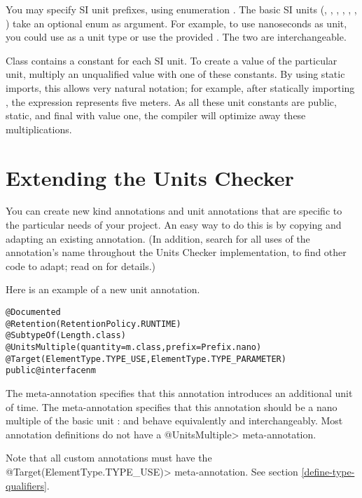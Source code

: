 You may specify SI unit prefixes, using enumeration .
The basic SI units
(, , , , ,
 , )
take an optional  enum as argument.
For example, to use nanoseconds as unit, you could use
 as a unit type or use the provided .
The two are interchangeable.

Class  contains a constant for each SI unit.
To create a value of the particular unit, multiply an unqualified
value with one of these constants.
By using static imports, this allows very natural notation; for
example, after statically importing ,
the expression  represents five meters.
As all these unit constants are public, static, and final with value
one, the compiler will optimize away these multiplications.



\section{Extending the Units Checker\label{extending-units}}

You can create new kind annotations and unit annotations that are specific
to the particular needs of your project.  An easy way to do this is by
copying and adapting an existing annotation.  (In addition, search for all
uses of the annotation's name throughout the Units Checker implementation,
to find other code to adapt; read on for details.)

Here is an example of a new unit annotation.

\begin{alltt}
@Documented
@Retention(RetentionPolicy.RUNTIME)
@SubtypeOf( \ttlcb{} Length.class \ttrcb{} )
@UnitsMultiple(quantity=m.class, prefix=Prefix.nano)
@Target({ElementType.TYPE_USE, ElementType.TYPE_PARAMETER})
public @interface nm \ttlcb{}\ttrcb{}
\end{alltt}

The  meta-annotation specifies that this annotation
introduces an additional unit of time.
The  meta-annotation specifies that this annotation
should be a nano multiple of the basic unit :   and
 behave equivalently and interchangeably.
Most annotation definitions do not have a \<@UnitsMultiple> meta-annotation.

Note that all custom annotations must have the
\<@Target({ElementType.TYPE\_USE})> meta-annotation. See section
\ref{define-type-qualifiers}.

